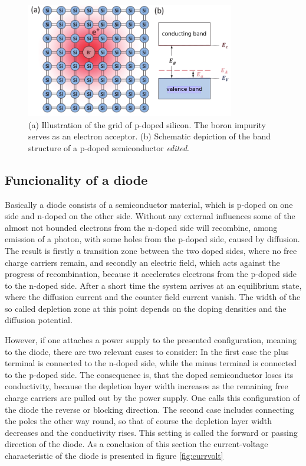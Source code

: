 \begin{figure}
  \centering
  \includegraphics[height=5cm]{Ordnername/acceptor_edit.pdf}
  \caption{(a) Illustration of the grid of p-doped silicon. The boron impurity serves as an electron acceptor.
  (b) Schematic depiction of the band structure of a p-doped semiconductor \cite{semiconductors} \textit{edited}.}
  \label{fig:acceptor}
\end{figure}

\subsection{Funcionality of a diode}

Basically a diode consists of a semiconductor material, which is p-doped on one side and n-doped on the other side.
Without any external influences some of the almost not bounded electrons from the n-doped side will recombine, among emission of a photon,
with some holes from the p-doped side, caused by diffusion. The result is firstly a transition zone between the two doped sides, where
no free charge carriers remain, and secondly an electric field, which acts against the progress of recombination,
because it accelerates electrons from the p-doped side to the n-doped side. After a short time the system arrives at an equilibrium state,
where the diffusion current and the counter field current vanish. The width of the so called depletion zone at this point
depends on the doping densities and the diffusion potential.

However, if one attaches a power supply to the presented configuration, meaning to the diode, there are two relevant cases to consider:
In the first case the plus terminal is connected to the n-doped side, while the minus terminal is connected to the
p-doped side. The consequence is, that the doped semiconductor loses its conductivity, because the depletion layer width
increases as the remaining free charge carriers are pulled out by the power supply. One calls this configuration of the diode
the reverse or blocking direction. The second case includes connecting the poles the other way round, so that of course
the depletion layer width decreases and the conductivity rises. This setting is called the forward or passing direction of the diode.
As a conclusion of this section the current-voltage characteristic of the diode is presented in figure \ref{fig:currvolt}

